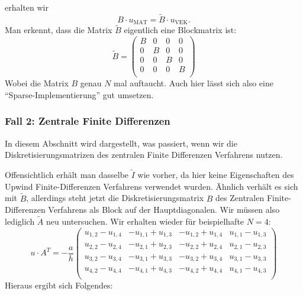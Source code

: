 \documentclass[12pt,a4paper]{scrartcl}
\numberwithin{equation}{section} %
\theoremstyle{definition}
\theoremstyle{plain}
\begin{document}
erhalten wir
\begin{equation}
B\cdot u_{\text{MAT}}=\tilde{B}\cdot u_{\text{VEK}}.
\end{equation} Man erkennt, dass die Matrix $\tilde{B}$ eigentlich eine Blockmatrix ist:
\begin{equation}
\tilde{B}=\begin{pmatrix}
B&0&0&0\\
0&B&0&0\\
0&0&B&0\\
0&0&0&B\\
\end{pmatrix}
\end{equation}
Wobei die Matrix $B$ genau $N$ mal auftaucht. Auch hier lässt sich also eine "`Sparse-Implementierung"' gut umsetzen.
\subsubsection{Fall 2: Zentrale Finite Differenzen} 
In diesem Abschnitt wird dargestellt, was passiert, wenn wir die Diskretisierungsmatrizen des zentralen Finite Differenzen Verfahrens nutzen. \par Offensichtlich erhält man dasselbe $\tilde{I}$ wie vorher, da hier keine Eigenschaften des Upwind Finite-Differenzen Verfahrens verwendet wurden. Ähnlich verhält es sich mit $\tilde{B}$, allerdings steht jetzt die Diskretisierungsmatrix $B$ des Zentralen Finite-Differenzen Verfahrens als Block auf der Hauptdiagonalen. Wir müssen also lediglich $\tilde{A}$ neu untersuchen. Wir erhalten wieder für beispielhafte $N=4$:
\begin{equation}
u\cdot A^T=-\frac{a}{h}\begin{pmatrix}
u_{1,2}-u_{1,4}&-u_{1,1}+u_{1,3}&-u_{1,2}+u_{1,4}&u_{1,1}-u_{1,3}\\
u_{2,2}-u_{2,4}&-u_{2,1}+u_{2,3}&-u_{2,2}+u_{2,4}&u_{2,1}-u_{2,3}\\
u_{3,2}-u_{3,4}&-u_{3,1}+u_{3,3}&-u_{3,2}+u_{3,4}&u_{3,1}-u_{3,3}\\
u_{4,2}-u_{4,4}&-u_{4,1}+u_{4,3}&-u_{4,2}+u_{4,4}&u_{4,1}-u_{4,3}\\
\end{pmatrix}
\end{equation}
Hieraus ergibt sich Folgendes:
\end{document}
